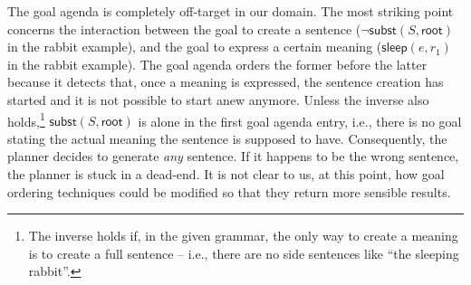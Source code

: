 The goal agenda is completely off-target in our domain. The most
striking point concerns the interaction between the goal to create a
sentence ($\neg \mathsf{subst}(S,\mathsf{root})$ in the rabbit
example), and the goal to express a certain meaning
($\mathsf{sleep}(e,r_1)$ in the rabbit example). The goal agenda
orders the former before the latter because it detects that, once a
meaning is expressed, the sentence creation has started and it is not
possible to start anew anymore. Unless the inverse also
holds,\footnote{The inverse holds if, in the given grammar, the only
  way to create a meaning is to create a full sentence -- i.e., there
  are no side sentences like ``the sleeping rabbit''.}
$\mathsf{subst}(S,\mathsf{root})$ is alone in the first goal agenda
entry, i.e., there is no goal stating the actual meaning the sentence
is supposed to have. Consequently, the planner decides to generate
{\em any} sentence. If it happens to be the wrong sentence, the
planner is stuck in a dead-end. %
It is not clear to us, at this point, how goal ordering techniques
could be modified so that they return more sensible results.














